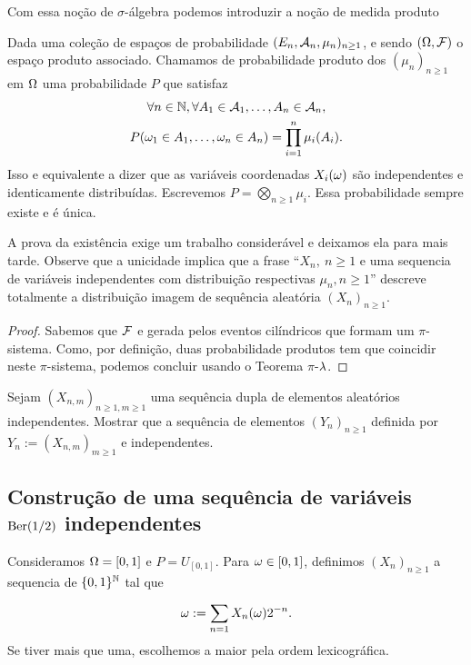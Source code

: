 \begin{topics}
Com essa noção de $\sigma$-álgebra podemos introduzir a noção de medida produto
\begin{definition}
Dada uma coleção de espaços de probabilidade $(E_n,{\mathcal A}_n,\mu_n)_{n\ge 1}$, e
sendo $(\Omega,{\mathcal F})$ o espaço produto associado. Chamamos de probabilidade produto dos $(\mu_n)_{n\ge 1}$ em $\Omega$ uma probabilidade $P$ que satisfaz
\begin{multline}
\forall n\in {\ensuremath{\mathbb N}}, \forall A_1\in {\ensuremath{\mathcal A}}_1,\dots, A_n\in {\ensuremath{\mathcal A}}_n, \\ P(\omega_1\in A_1,\dots ,\omega_n\in A_n)=\prod_{i=1}^n \mu_i(A_i).
\end{multline}
Isso e equivalente a dizer que as variáveis coordenadas $X_i(\omega)$ são independentes e identicamente distribuídas.
Escrevemos $P=\bigotimes_{n\ge 1} \mu_i$.
Essa probabilidade sempre existe e é única.
\end{definition}

A prova da existência exige um trabalho considerável e deixamos ela para mais tarde.
Observe que a unicidade implica que a frase ``$X_n, \ n\ge 1$ e uma sequencia de variáveis independentes com distribuição respectivas $\mu_n, n\ge 1$''
descreve totalmente a distribuição imagem de sequência aleatória $(X_n)_{n\ge 1}$.

\begin{proof}
 Sabemos que ${\mathcal F}$ e gerada pelos eventos cilíndricos que formam um $\pi$-sistema.
 Como, por definição, duas probabilidade produtos tem que coincidir neste $\pi$-sistema, podemos concluir usando
 o Teorema $\pi$-$\lambda$.
\end{proof}

\begin{exercise}\label{ex:duplo}
Sejam $(X_{n,m})_{n\ge 1,m\ge 1}$ uma sequência dupla de elementos aleatórios independentes.
Mostrar que a sequência de elementos $(Y_n)_{n\ge 1}$ definida por $Y_n:=(X_{n,m})_{m\ge 1}$ e independentes.
\end{exercise}

\end{topics}


\subsection{Construção de uma sequência de variáveis $\operatorname{Ber}(1/2)$ independentes}

 Consideramos $\Omega=[0,1]$ e $P=U_{[0,1]}$.
 Para $\omega\in[0,1]$, definimos $(X_n)_{n\ge 1}$ a sequencia de $\{0,1\}^{{\mathbb N}}$ tal que

 \begin{equation}\label{eq:deco}
 \omega:= \sum_{n=1} X_n(\omega)2^{-n}.
 \end{equation}
 Se tiver mais que uma, escolhemos a maior pela ordem lexicográfica.

